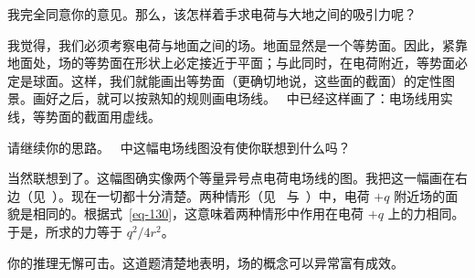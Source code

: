 \begin{dialogue}
\tchr 我完全同意你的意见。那么，该怎样着手求电荷与大地之间的吸引力呢？

\stdb 我觉得，我们必须考察电荷与地面之间的场。地面显然是一个等势面。因此，紧靠地面处，场的等势面在形状上必定接近于平面；与此同时，在电荷附近，等势面必定是球面。这样，我们就能画出等势面（更确切地说，这些面的截面）的定性图景。画好之后，就可以按熟知的规则画电场线。~ 中已经这样画了：电场线用实线，等势面的截面用虚线。

\tchr 请继续你的思路。~ 中这幅电场线图没有使你联想到什么吗？

\stdb 当然联想到了。这幅图确实像两个等量异号点电荷电场线的图。我把这一幅画在右边（见~）。现在一切都十分清楚。两种情形（见~ 与~）中，电荷 $+q$ 附近场的面貌是相同的。根据式~\eqref{eq-130}，这意味着两种情形中作用在电荷 $+q$ 上的力相同。于是，所求的力等于 $q^{2}/4r^{2}$。

\tchr 你的推理无懈可击。这道题清楚地表明，场的概念可以异常富有成效。

\end{dialogue}


\cleardoublepage

